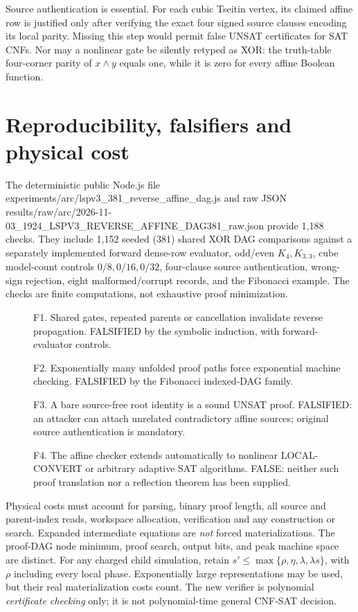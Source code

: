 \documentclass[11pt]{article}
\begin{document}
Source authentication is essential. For each cubic Tseitin vertex, its claimed affine row is justified only after verifying the exact four signed source clauses encoding its local parity. Missing this step would permit false UNSAT certificates for SAT CNFs. Nor may a nonlinear gate be silently retyped as XOR: the truth-table four-corner parity of \(x\land y\) equals one, while it is zero for every affine Boolean function.

\section*{Reproducibility, falsifiers and physical cost}
The deterministic public Node.js file experiments/arc/lspv3\_381\_reverse\_affine\_dag.js and raw JSON results/raw/arc/2026-11-03\_1924\_LSPV3\_REVERSE\_AFFINE\_DAG381\_raw.json provide 1,188 checks. They include 1,152 seeded (381) shared XOR DAG comparisons against a separately implemented forward dense-row evaluator, odd/even \(K_4,K_{3,3}\), cube model-count controls \(0/8,0/16,0/32\), four-clause source authentication, wrong-sign rejection, eight malformed/corrupt records, and the Fibonacci example. The checks are finite computations, not exhaustive proof minimization.

\begin{description}
\item[] F1. Shared gates, repeated parents or cancellation invalidate reverse propagation. FALSIFIED by the symbolic induction, with forward-evaluator controls.
\item[] F2. Exponentially many unfolded proof paths force exponential machine checking. FALSIFIED by the Fibonacci indexed-DAG family.
\item[] F3. A bare source-free root identity is a sound UNSAT proof. FALSIFIED: an attacker can attach unrelated contradictory affine sources; original source authentication is mandatory.
\item[] F4. The affine checker extends automatically to nonlinear LOCAL-CONVERT or arbitrary adaptive SAT algorithms. FALSE: neither such proof translation nor a reflection theorem has been supplied.
\end{description}

Physical costs must account for parsing, binary proof length, all source and parent-index reads, workspace allocation, verification and any construction or search. Expanded intermediate equations are \emph{not} forced materializations. The proof-DAG node minimum, proof search, output bits, and peak machine space are distinct. For any charged child simulation, retain \(s'\le\max\{\rho,\eta,\lambda,\lambda s\}\), with \(\rho\) including every local phase. Exponentially large representations may be used, but their real materialization costs count. The new verifier is polynomial \emph{certificate checking} only; it is not polynomial-time general CNF-SAT decision.
\end{document}
